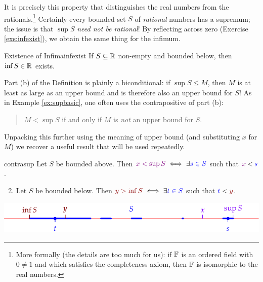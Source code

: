 It is precisely this property that distinguishes the real numbers from the rationals.\footnote{\label{fn:syntheticR}More formally (the details are too much for us): if $\mathbb{F}$ is an ordered field with $0\neq 1$ and which satisfies the completeness axiom, then $\mathbb{F}$ is isomorphic to the real numbers.} Certainly every bounded set $S$ of \emph{rational} numbers has a supremum; the issue is that $\sup S$ \emph{need not be rational}!\smallbreak
By reflecting across zero (Exercise \ref{exs:infexist}), we obtain the same thing for the infimum.

\begin{thm}{Existence of Infima}{infexist}
	If $S\subseteq\mathbb{R}$ non-empty and bounded below, then $\inf S\in\mathbb{R}$ exists.
\end{thm}


Part (b) of the Definition is plainly a biconditional: if $\sup S\le M$, then $M$ is at least as large as an upper bound and is therefore also an upper bound for $S$! As in Example \ref{ex:supbasic}, one often uses the contrapositive of part (b):

\begin{quote}
	$M<\sup S$ if and only if $M$ is \emph{not} an upper bound for $S$.
\end{quote}

Unpacking this further using the meaning of upper bound (and substituting $x$ for $M$) we recover a useful result that will be used repeatedly.

\begin{lemm}{}{contrasup}
	\exstart Let $S$ be bounded above. Then $\textcolor{Purple}{x<\sup S}\iff\exists \textcolor{blue}{s\in S}$ such that $\textcolor{Purple}{x}<\textcolor{blue}{s}$.
	\begin{enumerate}\setcounter{enumi}{1}
	  \item Let $S$ be bounded below. Then $\textcolor{Red4}{y>\inf S}\iff \exists \textcolor{blue}{t\in S}$ such that $\textcolor{blue}{t}<\textcolor{Red4}{y}$.
	\end{enumerate}
	\begin{center}
		\includegraphics{supinf4}
	\end{center}
\end{lemm}









